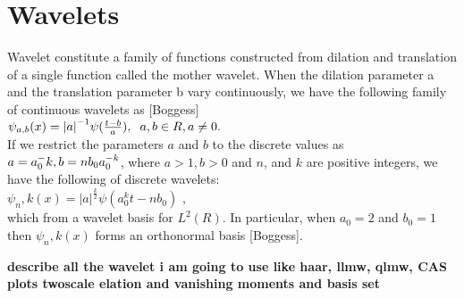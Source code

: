 \chapter{\label{ch:wavelets}Wavelets}
Wavelet constitute a family of functions constructed from dilation and translation of a single function called the mother wavelet. When the dilation parameter a and the translation parameter b vary continuously, we have the following family of continuous wavelets as [Boggess]\\

$\psi_{a,b}(x) = {|a|}^{-1} \psi(\frac {t-b}{a})
,   \hspace{0.2cm} a,b \in R, a \neq 0.
$\\

If we restrict the parameters $a$ and $b$ to the discrete values as $a = a_0 ^-k, \\b = n b_0 a_0^{-k}$, where $a>1,b>0$ and $n$, and $k$ are positive integers, we have the following of discrete wavelets:\\

$\psi_n,k(x) = |a|^\frac{k}{2} \psi(a_0^k t - nb_0)$ ,\\
 which from a wavelet basis for $L^2(R)$. In particular, when $a_0 = 2$ and $b_0 = 1$ then $\psi_n,k (x)$ forms an orthonormal basis [Boggess].
 
 {\bf describe all the wavelet i am going to use like haar, llmw, qlmw, CAS 
 plots twoscale elation and vanishing moments and basis set}
 
 
